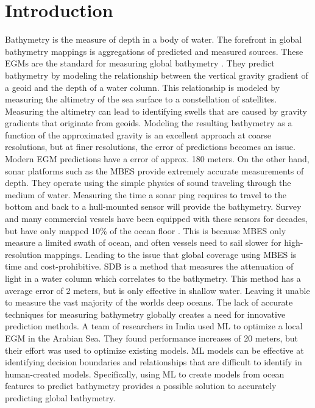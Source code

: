 
\section{Introduction}
\setlength{\parindent}{10ex}
Bathymetry is the measure of depth in a body of water.
The forefront in global bathymetry mappings is aggregations of predicted and measured sources. 
These \ac{EGM}s are the standard for measuring global bathymetry \cite{becker2009global}\cite{smith1994bathymetric}\cite{smith1997global}\cite{smith2010planning}.
They predict bathymetry by modeling the relationship between the vertical gravity gradient of a geoid and the depth of a water column.
This relationship is modeled by measuring the altimetry of the sea surface to a constellation of satellites.
Measuring the altimetry can lead to identifying swells that are caused by gravity gradients that originate from geoids.
Modeling the resulting bathymetry as a function of the approximated gravity is an excellent approach at coarse resolutions, but at finer resolutions, the error of predictions becomes an issue.
Modern \ac{EGM} predictions have a error of approx. 180 meters.
On the other hand, sonar platforms such as the \ac{MBES} \cite{farr1980multibeam} provide extremely accurate measurements of depth. 
They operate using the simple physics of sound traveling through the medium of water.
Measuring the time a sonar ping requires to travel to the bottom and back to a hull-mounted sensor will provide the bathymetry.
Survey and many commercial vessels have been equipped with these sensors for decades, but have only mapped 10\% of the ocean floor \cite{becker2009global}.
This is because \ac{MBES} only measure a limited swath of ocean, and often vessels need to sail slower for high-resolution mappings.
Leading to the issue that global coverage using \ac{MBES} is time and cost-prohibitive.
\ac{SDB} is a method that measures the attenuation of light in a water column which correlates to the bathymetry.
This method has a average error of 2 meters, but is only effective in shallow water.
Leaving it unable to measure the vast majority of the worlds deep oceans.
The lack of accurate techniques for measuring bathymetry globally creates a need for innovative prediction methods.
A team of researchers in India \cite{jena2012prediction} used \ac{ML} to optimize a local \ac{EGM} in the Arabian Sea.
They found performance increases of 20 meters, but their effort was used to optimize existing models.
\ac{ML} models can be effective at identifying decision boundaries and relationships that are difficult to identify in human-created models.
Specifically, using \ac{ML} to create models from ocean features to predict bathymetry provides a possible solution to accurately predicting global bathymetry.

